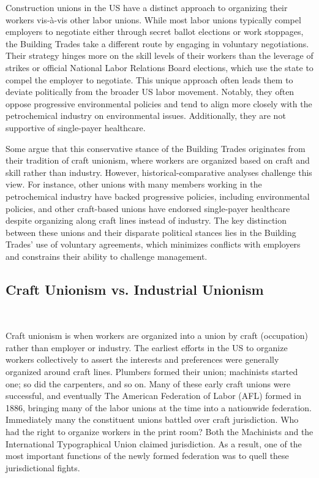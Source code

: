 Construction unions in the US have a distinct approach to organizing their workers vis-à-vis other labor unions. While most labor unions typically compel employers to negotiate either through secret ballot elections or work stoppages, the Building Trades take a different route by engaging in voluntary negotiations. Their strategy hinges more on the skill levels of their workers than the leverage of strikes or official National Labor Relations Board elections, which use the state to compel the employer to negotiate. This unique approach often leads them to deviate politically from the broader US labor movement. Notably, they often oppose progressive environmental policies and tend to align more closely with the petrochemical industry on environmental issues. Additionally, they are not supportive of single-payer healthcare.

Some argue that this conservative stance of the Building Trades originates from their tradition of craft unionism, where workers are organized based on craft and skill rather than industry. However, historical-comparative analyses challenge this view. For instance, other unions with many members working in the petrochemical industry have backed progressive policies, including environmental policies, and other craft-based unions have endorsed single-payer healthcare despite organizing along craft lines instead of industry. The key distinction between these unions and their disparate political stances lies in the Building Trades' use of voluntary agreements, which minimizes conflicts with employers and constrains their ability to challenge management.


\subsection{Craft Unionism vs. Industrial Unionism} \

Craft unionism is when workers are organized into a union by craft (occupation) rather than employer or industry. The earliest efforts in the US to organize workers collectively to assert the interests and preferences were generally organized around craft lines. Plumbers formed their union; machinists started one; so did the carpenters, and so on. Many of these early craft unions were successful, and eventually The American Federation of Labor (AFL) formed in 1886, bringing many of the labor unions at the time into a nationwide federation. Immediately many the constituent unions battled over craft jurisdiction. Who had the right to organize workers in the print room? Both the Machinists and the International Typographical Union claimed jurisdiction. As a result, one of the most important functions of the newly formed federation was to quell these jurisdictional fights.

